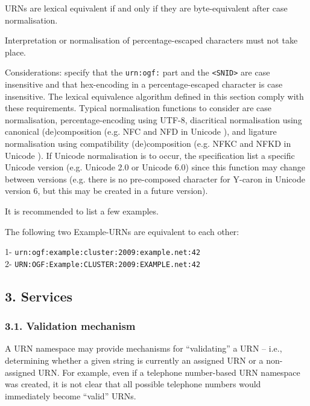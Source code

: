 \documentclass[12pt]{article}  %
\begin{document}
\begin{example}
URNs are lexical equivalent if and only if they are byte-equivalent after case 
normalisation.
\end{example}

\begin{example}

Interpretation or normalisation of percentage-escaped characters must not take place.
\end{example}

Considerations: \cite{rfc2141,rfc6453} specify that the
\texttt{\qq{}urn:ogf:\qq{}} part and the \texttt{<SNID>} are case insensitive and that
hex-encoding in a percentage-escaped character is case insensitive. The
lexical equivalence algorithm defined in this section \MUST{} comply with
these requirements. Typical normalisation functions to consider are case
normalisation, percentage-encoding using UTF-8, diacritical normalisation 
using canonical (de)composition (e.g. NFC and NFD in Unicode \cite{uax15}), 
and ligature normalisation using compatibility (de)composition (e.g. NFKC 
and NFKD in Unicode \cite{uax15}). If Unicode normalisation is to occur, 
the specification \SHOULD{} list a specific Unicode version (e.g. Unicode 
2.0 or Unicode 6.0) since this function may change between versions 
(e.g. there is no pre-composed character for Y-caron in Unicode version 6, 
but this may be created in a future version).

It is recommended to list a few examples.

\begin{example}
The following two Example-URNs are equivalent to each other:

  1- \texttt{urn:ogf:example:cluster:2009:example.net:42} \\
  2- \texttt{URN:OGF:Example:CLUSTER:2009:EXAMPLE.net:42}
\end{example}

\subsection*{3. Services}

\subsubsection*{3.1. Validation mechanism}

A URN namespace may provide mechanisms for “validating” a URN -- 
i.e., determining whether a given string is currently an assigned URN 
or a non-assigned URN.
For example, even if a telephone number-based URN namespace was
created, it is not clear that all possible telephone numbers would
immediately become “valid” URNs.
\end{document}
